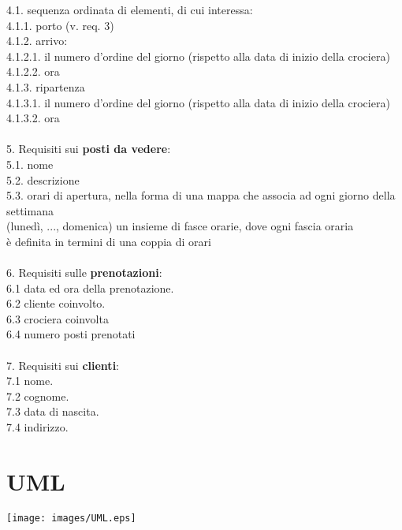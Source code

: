 \documentclass[12pt, letterpaper]{article}
\newcommand{\acc}{\\\hphantom{}\\}
\begin{document}
\hphantom{ident}4.1. sequenza ordinata di elementi, di cui interessa:\\
\hphantom{ident}\hphantom{ident}4.1.1. porto (v. req. 3)\\
\hphantom{ident}\hphantom{ident}4.1.2. arrivo:\\
\hphantom{ident}\hphantom{ident}\hphantom{ident}4.1.2.1. il numero d'ordine del giorno (rispetto alla data di inizio della crociera)\\
\hphantom{ident}\hphantom{ident}\hphantom{ident}4.1.2.2. ora\\
\hphantom{ident}\hphantom{ident}4.1.3. ripartenza	\\
\hphantom{ident}\hphantom{ident}\hphantom{ident}4.1.3.1. il numero d'ordine del giorno (rispetto alla data di inizio della crociera)\\
\hphantom{ident}\hphantom{ident}\hphantom{ident}4.1.3.2. ora
\acc
5. Requisiti sui \textbf{posti da vedere}:\\
\hphantom{ident}5.1. nome\\
\hphantom{ident}5.2. descrizione\\
\hphantom{ident}5.3. orari di apertura, nella forma di una mappa che associa ad ogni giorno della settimana\\
\hphantom{ident}\hphantom{ident}(lunedì, ..., domenica) un insieme di fasce orarie, dove ogni fascia oraria\\
\hphantom{ident}\hphantom{ident}è definita in termini di una coppia di orari\acc
6. Requisiti sulle \textbf{prenotazioni}:\\
\hphantom{ident}6.1 data ed ora della prenotazione.\\
\hphantom{ident}6.2 cliente coinvolto.\\
\hphantom{ident}6.3 crociera coinvolta\\
\hphantom{ident}6.4 numero posti prenotati\acc
7. Requisiti sui \textbf{clienti}:\\
\hphantom{ident}7.1 nome.\\
\hphantom{ident}7.2 cognome.\\
\hphantom{ident}7.3 data di nascita.\\
\hphantom{ident}7.4 indirizzo.
\newpage
\section{UML}\begin{center}

    \texttt{[image: images/UML.eps]}
\end{center}
\newpage
\end{document}
